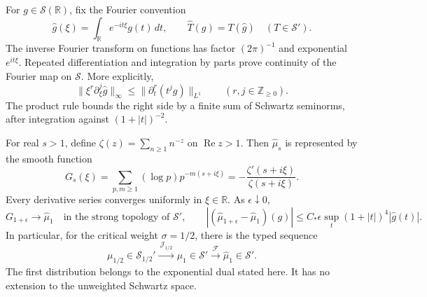 For $g\in\mathcal S(\mathbb R)$, fix the Fourier convention
\[
 \widehat g(\xi)=\int_{\mathbb R}e^{-it\xi}g(t)\,dt,
 \qquad
 \widehat T(g)=T(\widehat g)\quad(T\in\mathcal S').
\]
The inverse Fourier transform on functions has factor $(2\pi)^{-1}$
and exponential $e^{it\xi}$.
Repeated differentiation and integration by parts prove continuity of the
Fourier map on $\mathcal S$.  More explicitly,
\[
 \|\xi^r\partial_\xi^j\widehat g\|_\infty
    \leq\|\partial_t^r(t^jg)\|_{L^1}
       \qquad(r,j\in\mathbb Z_{\geq0}).
\]
The product rule bounds the right side by a finite sum of Schwartz
seminorms, after integration against $(1+|t|)^{-2}$.

\begin{theorem}
\label{acfd:fourier-boundary}
For real $s>1$, define $\zeta(z)=\sum_{n\geq1}n^{-z}$ on
$\operatorname{Re}z>1$.  Then $\widehat\mu_s$ is represented by the smooth function
\begin{equation}\label{acfd:dirichlet-fourier}
 G_s(\xi)=\sum_{p,m\geq1}(\log p)p^{-m(s+i\xi)}
              =-\frac{\zeta'(s+i\xi)}{\zeta(s+i\xi)}.
\end{equation}
Every derivative series converges uniformly in $\xi\in\mathbb R$.
As $\epsilon\downarrow0$,
\begin{equation}\label{acfd:boundary-limit}
 G_{1+\epsilon}\longrightarrow\widehat\mu_1
                 \quad\text{in the strong topology of }\mathcal S',
 \qquad
 |(\widehat\mu_{1+\epsilon}-\widehat\mu_1)(g)|
       \leq C_*\epsilon\sup_t(1+|t|)^4|\widehat g(t)|.
\end{equation}
In particular, for the critical weight $\sigma=1/2$, there is the typed sequence
\[
 \mu_{1/2}\in\mathcal S_{1/2}'
 \xrightarrow{\ \mathcal J_{1/2}\ }
 \mu_1\in\mathcal S'
 \xrightarrow{\ \mathcal F\ }
 \widehat\mu_1\in\mathcal S'.
\]
The first distribution belongs to the exponential dual stated here.
It has no extension to the unweighted Schwartz space.
\end{theorem}

